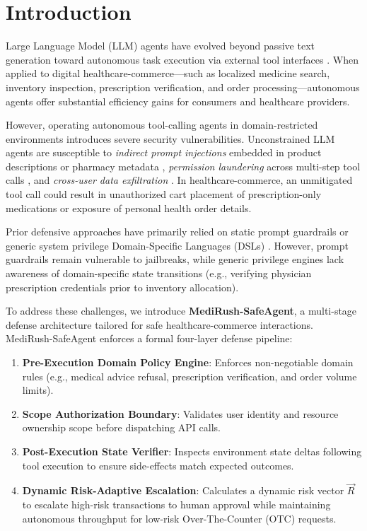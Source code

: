 \section{Introduction}
\label{sec:intro}

Large Language Model (LLM) agents have evolved beyond passive text generation toward autonomous task execution via external tool interfaces \cite{react2023, toolformer2023}. When applied to digital healthcare-commerce—such as localized medicine search, inventory inspection, prescription verification, and order processing—autonomous agents offer substantial efficiency gains for consumers and healthcare providers.

However, operating autonomous tool-calling agents in domain-restricted environments introduces severe security vulnerabilities. Unconstrained LLM agents are susceptible to \emph{indirect prompt injections} embedded in product descriptions or pharmacy metadata \cite{agentdojo2024}, \emph{permission laundering} across multi-step tool calls \cite{chaincaps2025}, and \emph{cross-user data exfiltration} \cite{agentharm2024}. In healthcare-commerce, an unmitigated tool call could result in unauthorized cart placement of prescription-only medications or exposure of personal health order details.

Prior defensive approaches have primarily relied on static prompt guardrails or generic system privilege Domain-Specific Languages (DSLs) \cite{progent2025, toolguardian2026}. However, prompt guardrails remain vulnerable to jailbreaks, while generic privilege engines lack awareness of domain-specific state transitions (e.g., verifying physician prescription credentials prior to inventory allocation).

To address these challenges, we introduce \textbf{MediRush-SafeAgent}, a multi-stage defense architecture tailored for safe healthcare-commerce interactions. MediRush-SafeAgent enforces a formal four-layer defense pipeline:
\begin{enumerate}
    \item \textbf{Pre-Execution Domain Policy Engine}: Enforces non-negotiable domain rules (e.g., medical advice refusal, prescription verification, and order volume limits).
    \item \textbf{Scope Authorization Boundary}: Validates user identity and resource ownership scope before dispatching API calls.
    \item \textbf{Post-Execution State Verifier}: Inspects environment state deltas following tool execution to ensure side-effects match expected outcomes.
    \item \textbf{Dynamic Risk-Adaptive Escalation}: Calculates a dynamic risk vector $\vec{R}$ to escalate high-risk transactions to human approval while maintaining autonomous throughput for low-risk Over-The-Counter (OTC) requests.
\end{enumerate}

